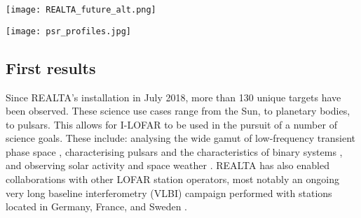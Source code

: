 \begin{figure*}[t]
    \centering
    \texttt{[image: REALTA\_future\_alt.png]}
    \caption[System diagram for REALTA.]{System diagram for REALTA, including future data preparation, processing, and archiving capabilities. Solid lines indicate existing features, while dashed lines denote stages under development. REALTA is currently capable of capturing data from the I-LOFAR radio telescope and archiving it in near real-time. We are in the process of developing a variety of data processing pipelines that will flag RFI, identify and characterise SRBs, pulsars, RRATs, FRBs, and SETI signals. Machine learning methods are being explored for a number of these tasks.}
    \label{fig:REALTA_future}
\end{figure*}

\begin{figure*}[t]
    \centering
    \texttt{[image: psr\_profiles.jpg]}
    \caption[Sample of 19 pulsars observed with I-LOFAR and REALTA.]{Sample of 19 pulsars observed with I-LOFAR and REALTA. Each of these observations is 6 minutes in duration and were taken on 4--5 March 2020 using the HBA antennas (\SIrange{110}{190}{\mega \hertz}). The data were processed using the method described in \S \ref{sec:pulsarproc} and plotted using \texttt{PSRCHIVE}. The x-axis in each plot is the pulse phase in radians, while the y-axis is flux density in arbitrary units.}
    \label{fig:pulsar-pc1}
\end{figure*}

\subsection{First results}
\label{sec:results}
Since REALTA's installation in July 2018, more than 130 unique targets have been observed. These science use cases range from the Sun, to planetary bodies, to pulsars. This allows for I-LOFAR to be used in the pursuit of a number of science goals. These include: analysing the wide gamut of low-frequency transient phase space \citep{KeanePhaseSpace2018}, characterising pulsars and the characteristics of binary systems \citep{Manchester2017}, and observing solar activity and space weather \citep{Maguire2020}. 
REALTA has also enabled collaborations with other LOFAR station operators, most notably an ongoing very long baseline interferometry (VLBI) campaign performed with stations located in Germany, France, and Sweden \citep[in a continuation of ][]{Wucknitz2019}.

